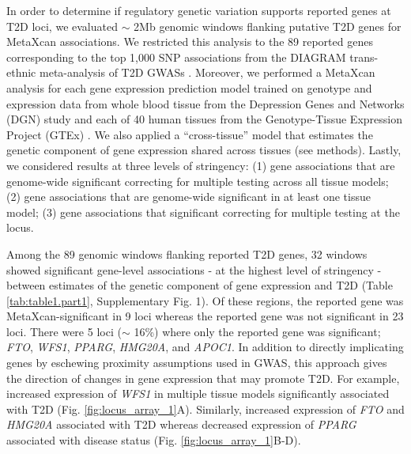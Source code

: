 \documentclass[10pt]{article}
\begin{document}
In order to determine if regulatory genetic variation supports reported genes at T2D loci, we evaluated $\sim$ 2Mb genomic windows flanking putative T2D genes for MetaXcan associations. We restricted this analysis to the 89 reported genes corresponding to the top 1,000 SNP associations from the DIAGRAM trans-ethnic meta-analysis of T2D GWASs \cite{Replication2014}. Moreover, we performed a MetaXcan analysis for each gene expression prediction model trained on genotype and expression data from whole blood tissue from the Depression Genes and Networks (DGN) study  \cite{Battle2014} and each of 40 human tissues from the Genotype-Tissue Expression Project (GTEx) \cite{TheGTExConsortium2015}. We also applied a ``cross-tissue'' model \cite{Wheeler2016} that estimates the genetic component of gene expression shared across tissues (see methods). Lastly, we considered results at three levels of stringency: (1) gene associations that are genome-wide significant correcting for multiple testing across all tissue models; (2) gene associations that are genome-wide significant in at least one tissue model; (3) gene associations that significant correcting for multiple testing at the locus. 

Among the 89 genomic windows flanking reported T2D genes, 32 windows showed significant gene-level associations - at the highest level of stringency - between estimates of the genetic component of gene expression and T2D (Table \ref{tab:table1.part1}, Supplementary Fig. 1). Of these regions, the reported gene was MetaXcan-significant in 9 loci whereas the reported gene was not significant in 23 loci. There were 5 loci ($\sim$ 16\%) where only the reported gene was significant; \textit{FTO}, \textit{WFS1}, \textit{PPARG}, \textit{HMG20A}, and \textit{APOC1}. In addition to directly implicating genes by eschewing proximity assumptions used in GWAS, this approach gives the direction of changes in gene expression that may promote T2D. For example, increased expression of \textit{WFS1} in multiple tissue models significantly associated with T2D (Fig. \ref{fig:locus_array_1}A). Similarly, increased expression of \textit{FTO} and \textit{HMG20A} associated with T2D whereas decreased expression of \textit{PPARG} associated with disease status (Fig. \ref{fig:locus_array_1}B-D).
\end{document}
